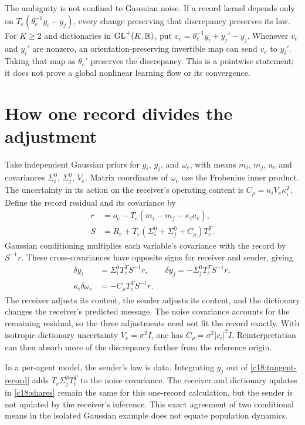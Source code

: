 The ambiguity is not confined to Gaussian noise. If a record kernel depends only on $T_e(\theta_e^{-1}y_i-y_j)$, every change preserving that discrepancy preserves its law. For $K\geq2$ and dictionaries in $\mathrm{GL}^+(K,\mathbb R)$, put $v_e=\theta_e^{-1}y_i+y_j'-y_j$. Whenever $v_e$ and $y_i'$ are nonzero, an orientation-preserving invertible map can send $v_e$ to $y_i'$. Taking that map as $\theta_e'$ preserves the discrepancy. This is a pointwise statement; it does not prove a global nonlinear learning flow or its convergence.

\section{How one record divides the adjustment}

Take independent Gaussian priors for $y_i$, $y_j$, and $\omega_e$, with means $m_i$, $m_j$, $a_e$ and covariances $\Sigma_i^0$, $\Sigma_j^0$, $V_e$. Matrix coordinates of $\omega_e$ use the Frobenius inner product. The uncertainty in its action on the receiver's operating content is $C_\rho=\kappa_iV_e\kappa_i^T$. Define the record residual and its covariance by
\begin{equation}
 \begin{aligned}
 r&=o_e-T_e(m_i-m_j-\kappa_i a_e),\\
 S&=R_e+T_e(\Sigma_i^0+\Sigma_j^0+C_\rho)T_e^T.
 \end{aligned}
 \label{c18:residual}
\end{equation}
Gaussian conditioning multiplies each variable's covariance with the record by $S^{-1}r$. These cross-covariances have opposite signs for receiver and sender, giving
\begin{equation}
 \begin{aligned}
 \delta y_i&=\Sigma_i^0T_e^TS^{-1}r,\qquad
 \delta y_j=-\Sigma_j^0T_e^TS^{-1}r,\\
 \kappa_i\delta\omega_e&=-C_\rho T_e^TS^{-1}r.
 \end{aligned}
 \label{c18:shares}
\end{equation}
The receiver adjusts its content, the sender adjusts its content, and the dictionary changes the receiver's predicted message. The noise covariance accounts for the remaining residual, so the three adjustments need not fit the record exactly. With isotropic dictionary uncertainty $V_e=\sigma^2I$, one has $C_\rho=\sigma^2|c_i|^2I$. Reinterpretation can then absorb more of the discrepancy farther from the reference origin.

In a per-agent model, the sender's law is data. Integrating $y_j$ out of \cref{c18:tangent-record} adds $T_e\Sigma_j^0T_e^T$ to the noise covariance. The receiver and dictionary updates in \cref{c18:shares} remain the same for this one-record calculation, but the sender is not updated by the receiver's inference. This exact agreement of two conditional means in the isolated Gaussian example does not equate population dynamics.

